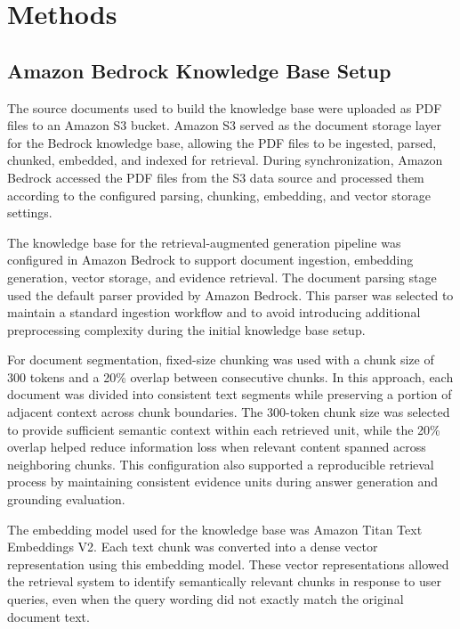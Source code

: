 \section{Methods}

\subsection{Amazon Bedrock Knowledge Base Setup}
\label{subsec:bedrock_kb_setup}

The source documents used to build the knowledge base were uploaded as PDF files to an Amazon S3 bucket. Amazon S3 served as the document storage layer for the Bedrock knowledge base, allowing the PDF files to be ingested, parsed, chunked, embedded, and indexed for retrieval. During synchronization, Amazon Bedrock accessed the PDF files from the S3 data source and processed them according to the configured parsing, chunking, embedding, and vector storage settings.

The knowledge base for the retrieval-augmented generation pipeline was configured in Amazon Bedrock to support document ingestion, embedding generation, vector storage, and evidence retrieval. The document parsing stage used the default parser provided by Amazon Bedrock. This parser was selected to maintain a standard ingestion workflow and to avoid introducing additional preprocessing complexity during the initial knowledge base setup.

For document segmentation, fixed-size chunking was used with a chunk size of 300 tokens and a 20\% overlap between consecutive chunks. In this approach, each document was divided into consistent text segments while preserving a portion of adjacent context across chunk boundaries. The 300-token chunk size was selected to provide sufficient semantic context within each retrieved unit, while the 20\% overlap helped reduce information loss when relevant content spanned across neighboring chunks. This configuration also supported a reproducible retrieval process by maintaining consistent evidence units during answer generation and grounding evaluation.

The embedding model used for the knowledge base was Amazon Titan Text Embeddings V2. Each text chunk was converted into a dense vector representation using this embedding model. These vector representations allowed the retrieval system to identify semantically relevant chunks in response to user queries, even when the query wording did not exactly match the original document text.

